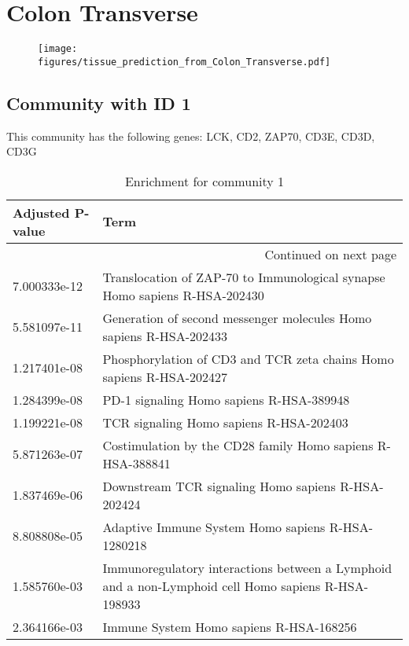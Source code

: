 
\section*{Colon Transverse}
\begin{figure}[h!]
\centering
\texttt{[image: figures/tissue\_prediction\_from\_Colon\_Transverse.pdf]}
\end{figure}



\subsection*{Community with ID 1}
This community has the following genes: LCK, CD2, ZAP70, CD3E, CD3D, CD3G
\\
\begin{longtable}{p{2.4cm}p{14.5cm}}
\caption{Enrichment for community 1}\\
\toprule
Adjusted \newline P-value &                                                                                                Term \\
\midrule
\endhead
\midrule
\multicolumn{2}{r}{{Continued on next page}} \\
\midrule
\endfoot

\bottomrule
\endlastfoot
             7.000333e-12 &                          Translocation of ZAP-70 to Immunological synapse Homo sapiens R-HSA-202430 \\
             5.581097e-11 &                                  Generation of second messenger molecules Homo sapiens R-HSA-202433 \\
             1.217401e-08 &                                Phosphorylation of CD3 and TCR zeta chains Homo sapiens R-HSA-202427 \\
             1.284399e-08 &                                                            PD-1 signaling Homo sapiens R-HSA-389948 \\
             1.199221e-08 &                                                             TCR signaling Homo sapiens R-HSA-202403 \\
             5.871263e-07 &                                          Costimulation by the CD28 family Homo sapiens R-HSA-388841 \\
             1.837469e-06 &                                                  Downstream TCR signaling Homo sapiens R-HSA-202424 \\
             8.808808e-05 &                                                   Adaptive Immune System Homo sapiens R-HSA-1280218 \\
             1.585760e-03 &  Immunoregulatory interactions between a Lymphoid and a non-Lymphoid cell Homo sapiens R-HSA-198933 \\
             2.364166e-03 &                                                             Immune System Homo sapiens R-HSA-168256 \\
\end{longtable}


